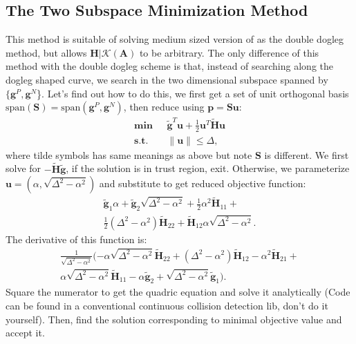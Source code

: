 \documentclass[annual]{acmsiggraph}
\newcommand{\E}[1]{\mathbf{#1}}
\begin{document}
\subsection{The Two Subspace Minimization Method}
This method is suitable of solving medium sized version of  as the double dogleg method, but allows $\E{H}|\mathcal{K}(\E{A})$ to be arbitrary. The only difference of this method with the double dogleg scheme is that, instead of searching along the dogleg shaped curve, we search in the two dimensional subspace spanned by $\{\E{g}^P,\E{g}^N$\}. Let's find out how to do this, we first get a set of unit orthogonal basis $\text{span}(\E{S})=\text{span}(\E{g}^P,\E{g}^N)$, then reduce  using $\E{p}=\E{S}\E{u}$:
\begin{subequations}
\label{pb:TR_PROB_R}
\begin{align}
\E{min}\text{ }&\tilde{\E{g}}^T\E{u}+\frac{1}{2}\E{u}^T\tilde{\E{H}}\E{u}	\\
\E{s.t.}\text{ }&\|\E{u}\|\leq\Delta,
\end{align}
\end{subequations}
where tilde symbols has same meanings as above but note $\E{S}$ is different. We first solve for $-\tilde{\E{H}}\tilde{\E{g}}$, if the solution is in trust region, exit. Otherwise, we parameterize $\E{u}=(\alpha,\sqrt{\Delta^2-\alpha^2})$ and substitute to get reduced objective function:
\begin{eqnarray*}
\tilde{\E{g}}_1\alpha+\tilde{\E{g}}_2\sqrt{\Delta^2-\alpha^2}+\frac{1}{2}\alpha^2\tilde{\E{H}}_{11}+	\\
\frac{1}{2}(\Delta^2-\alpha^2)\tilde{\E{H}}_{22}+\tilde{\E{H}}_{12}\alpha\sqrt{\Delta^2-\alpha^2}.
\end{eqnarray*}
The derivative of this function is:
\begin{eqnarray*}
\frac{1}{\sqrt{\Delta^2-\alpha^2}}(-\alpha\sqrt{\Delta^2-\alpha^2}\tilde{\E{H}}_{22}+(\Delta^2-\alpha^2)\tilde{\E{H}}_{12}-\alpha^2\tilde{\E{H}}_{21}+	\\
\alpha\sqrt{\Delta^2-\alpha^2}\tilde{\E{H}}_{11}-\alpha\tilde{\E{g}}_2+\sqrt{\Delta^2-\alpha^2}\tilde{\E{g}}_1).
\end{eqnarray*}
Square the numerator to get the quadric equation and solve it analytically (Code can be found in a conventional continuous collision detection lib, don't do it yourself). Then, find the solution corresponding to minimal objective value and accept it.
\end{document}

